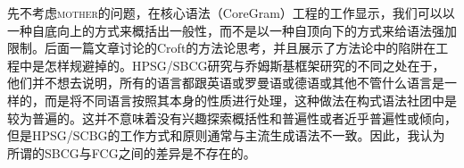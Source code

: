 先不考虑\textsc{mother}的问题，在核心语法（CoreGram）工程\citep{MuellerCoreGramBrief,MuellerCoreGram}的工作显示，我们可以以一种自底向上的方式来概括出一般性，而不是以一种自顶向下的方式来给语法强加限制。后面一篇文章讨论的Croft的方法论思考，并且展示了方法论中的陷阱在工程中是怎样规避掉的。HPSG/SBCG研究与乔姆斯基框架研究的不同之处在于，他们并不想去说明，所有的语言都跟英语或罗曼语或德语或其他不管什么语言是一样的，而是将不同语言按照其本身的性质进行处理，这种做法在构式语法社团中是较为普遍的。这并不意味着没有兴趣探索概括性和普遍性或者近乎普遍性或倾向，但是HPSG/SCBG的工作方式和原则通常与主流生成语法不一致。因此，我认为所谓的SBCG与FCG之间的差异是不存在的。


